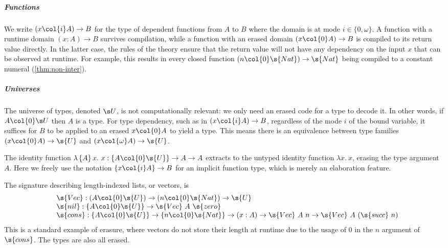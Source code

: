 \subparagraph{Functions}\label{ssub:dep-funcs} We write $(x \col{i} A) \to B$
for the type of dependent functions from $A$ to $B$ where the domain is at mode
$i \in \{0, \omega\}$. A function with a runtime domain $(x : A) \to B$ survives
compilation, while a function with an erased domain $(x \col{0} A) \to B$ is
compiled to its return value directly. In the latter case, the rules of the
theory ensure that the return value will not have any dependency on the input
$x$ that can be observed at runtime. For example, this results in every closed
function $(n \col{0} \s{Nat}) \to \s{Nat}$ being compiled to a constant numeral
(\cref{thm:non-inter}).

\subparagraph{Universes}\label{ssub:universes} The universe of types, denoted
$\s U$, is not computationally relevant: we only need an erased code for a type
to decode it. In other words, if $A \col{0} \s U$ then $A$ is a type. For type
dependency, such as in $(x \col{i} A) \to B$, regardless of the mode $i$ of the
bound variable, it suffices for $B$ to be applied to an erased $x \col{0} A$ to
yield a type. This means there is an equivalence between type families $(x
\col{0} A) \to \s{U}$ and $(x \col{\omega} A) \to \s{U}$.

\begin{example}
 The identity function $\lambda \, \{A\} \, x.\ x : \{A \col{0} \s{U}\} \to A \to A$
  extracts to the untyped identity function $\lambda x.\ x$, erasing the type argument $A$.
  Here we freely use the notation $\{x \col{i} A\} \to B$ for an implicit
  function type, which is merely an elaboration feature.
\end{example}

\begin{example}\label{ex:vec}
The signature describing length-indexed lists, or vectors, is
\[\begin{array}{ll}
 & \s{Vec} : (A  \col{0} \s{U}) \to (n \col{0} \s{Nat}) \to \s{U} \\
 & \s{nil} : \{A  \col{0} \s{U}\} \to \s{Vec}\ A\ \s{zero} \\
 & \s{cons} : \{A \col{0} \s{U}\} \to \{n \col{0} \s{Nat}\} \to (x : A) \to \s{Vec}\ A\ n \to \s{Vec}\ A\ (\s{succ}\ n) \\
\end{array}\] This is a standard example of erasure, where vectors do not store
their length at runtime due to the usage of $0$ in the $n$ argument of
$\s{cons}$. The types are also all erased.
\end{example}


